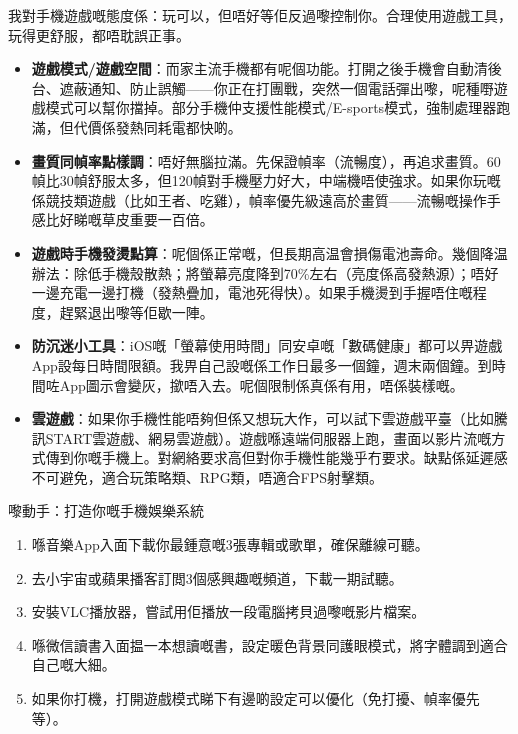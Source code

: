 
我對手機遊戲嘅態度係：玩可以，但唔好等佢反過嚟控制你。合理使用遊戲工具，玩得更舒服，都唔耽誤正事。

\begin{itemize}
  \item \textbf{遊戲模式/遊戲空間}：而家主流手機都有呢個功能。打開之後手機會自動清後台、遮蔽通知、防止誤觸——你正在打團戰，突然一個電話彈出嚟，呢種嘢遊戲模式可以幫你擋掉。部分手機仲支援性能模式/E-sports模式，強制處理器跑滿，但代價係發熱同耗電都快啲。
  \item \textbf{畫質同幀率點樣調}：唔好無腦拉滿。先保證幀率（流暢度），再追求畫質。60幀比30幀舒服太多，但120幀對手機壓力好大，中端機唔使強求。如果你玩嘅係競技類遊戲（比如王者、吃雞），幀率優先級遠高於畫質——流暢嘅操作手感比好睇嘅草皮重要一百倍。
  \item \textbf{遊戲時手機發燙點算}：呢個係正常嘅，但長期高温會損傷電池壽命。幾個降温辦法：除低手機殼散熱；將螢幕亮度降到70\%左右（亮度係高發熱源）；唔好一邊充電一邊打機（發熱疊加，電池死得快）。如果手機燙到手握唔住嘅程度，趕緊退出嚟等佢歇一陣。
  \item \textbf{防沉迷小工具}：iOS嘅「螢幕使用時間」同安卓嘅「數碼健康」都可以畀遊戲App設每日時間限額。我畀自己設嘅係工作日最多一個鐘，週末兩個鐘。到時間咗App圖示會變灰，撳唔入去。呢個限制係真係有用，唔係裝樣嘅。
  \item \textbf{雲遊戲}：如果你手機性能唔夠但係又想玩大作，可以試下雲遊戲平臺（比如騰訊START雲遊戲、網易雲遊戲）。遊戲喺遠端伺服器上跑，畫面以影片流嘅方式傳到你嘅手機上。對網絡要求高但對你手機性能幾乎冇要求。缺點係延遲感不可避免，適合玩策略類、RPG類，唔適合FPS射擊類。
\end{itemize}

\begin{tcbpractice}{嚟動手：打造你嘅手機娛樂系統}
\begin{enumerate}
  \item 喺音樂App入面下載你最鍾意嘅3張專輯或歌單，確保離線可聽。
  \item 去小宇宙或蘋果播客訂閲3個感興趣嘅頻道，下載一期試聽。
  \item 安裝VLC播放器，嘗試用佢播放一段電腦拷貝過嚟嘅影片檔案。
  \item 喺微信讀書入面揾一本想讀嘅書，設定暖色背景同護眼模式，將字體調到適合自己嘅大細。
  \item 如果你打機，打開遊戲模式睇下有邊啲設定可以優化（免打擾、幀率優先等）。
\end{enumerate}

\end{tcbpractice}
